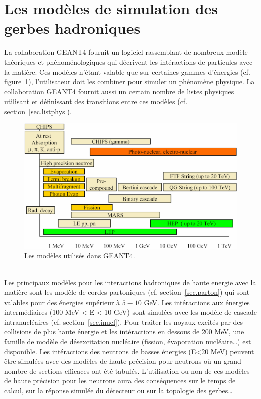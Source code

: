 \section{Les modèles de simulation des gerbes hadroniques}
La collaboration GEANT4 \cite{geant4} fournit un logiciel rassemblant de nombreux modèle théoriques et phénoménologiques qui décrivent les intéractions de particules avec la matière. Ces modèles n'étant valable que sur certaines gammes d'énergies (cf. figure~\ref{fig.model}), l'utilisateur doit les combiner pour simuler un phénomène physique. La collaboration GEANT4 fournit aussi un certain nombre de listes physiques utilisant et définissant des transitions entre ces modèles (cf. section~\ref{sec.listphys}).
\begin{figure}[!ht]
  \begin{center}
    \includegraphics[width=.8\textwidth]{Digitizer/figs/HadronicModelsInventory.jpg}
    \caption{Les modèles utilisés dans GEANT4.}
    \label{fig.model}
  \end{center}
\end{figure}
\\
Les principaux modèles pour les interactions hadroniques de haute energie avec la matière sont les modèle de cordes partoniques (cf. section~\ref{sec.parton}) qui sont valables pour des énergies supérieur à $5-10$ GeV. Les intéractions aux énergies intermédiaires (100 MeV < E < 10 GeV) sont simulées avec les modèle de cascade intranucléaires (cf. section~\ref{sec.inucl}). Pour traiter les noyaux excités par des collisions de plus haute énergie et les intéractions en dessous de 200 MeV, une famille de modèle de désexcitation nucléaire (fission, évaporation nucléaire\dots) est disponible. Les intéractions des neutrons de basses énergies (E<20 MeV) peuvent être simulées avec des modèles de haute précision pour neutrons où un grand nombre de sections efficaces ont été tabulés. L'utilisation ou non de ces modèles de haute précision pour les neutrons aura des conséquences sur le temps de calcul, sur la réponse simulée du détecteur ou sur la topologie des gerbes\dots
